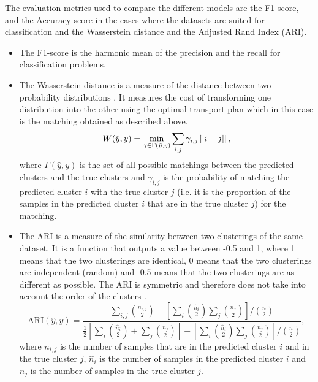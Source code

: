 The evaluation metrics used to compare the different models are the F1-score, and the Accuracy score in the cases where the datasets are suited for classification and the Wasserstein distance and the Adjusted Rand Index (ARI). %
\begin{itemize}
    \item The F1-score is the harmonic mean of the precision and the recall for classification problems.
    \item The Wasserstein distance is a measure of the distance between two probability distributions \citep{ramdas2017wasserstein}. 
        It measures the cost of transforming one distribution into the other using the optimal transport plan which in this case is the matching obtained as described above.
        \begin{equation}
            W(\hat{y}, y) = \min_{\gamma \in \Gamma(\hat{y}, y)} \sum_{i, j} \gamma_{i, j} \left|\left|i - j\right|\right|
        ,\end{equation}
    where $\Gamma(\hat{y}, y)$ is the set of all possible matchings between the predicted clusters and the true clusters and $\gamma_{i, j}$ is the probability of matching the predicted cluster $i$ with the true cluster $j$ (i.e. it is the proportion of the samples in the predicted cluster $i$ that are in the true cluster $j$) for the matching.
\item The ARI is a measure of the similarity between two clusterings of the same dataset. It is a function that outputs a value between -0.5 and 1, where 1 means that the two clusterings are identical, 0 means that the two clusterings are independent (random) and -0.5 means that the two clusterings are as different as possible. The ARI is symmetric and therefore does not take into account the order of the clusters \citep{steinley2004properties}. 
    \begin{equation}
    \text{ARI}(\hat{y}, y) = \frac{\sum_{i, j} \binom{n_{i, j}}{2} - \left[\sum_i \binom{\hat{n}_i}{2} \sum_j \binom{n_j}{2}\right] / \binom{n}{2}}{\frac{1}{2} \left[\sum_i \binom{\hat{n}_i}{2} + \sum_j \binom{n_j}{2}\right] - \left[\sum_i \binom{\hat{n}_i}{2} \sum_j \binom{n_j}{2}\right] / \binom{n}{2}}
    ,\end{equation}
where $n_{i, j}$ is the number of samples that are in the predicted cluster $i$ and in the true cluster $j$, $\hat{n}_i$ is the number of samples in the predicted cluster $i$ and $n_j$ is the number of samples in the true cluster $j$.
\end{itemize}

